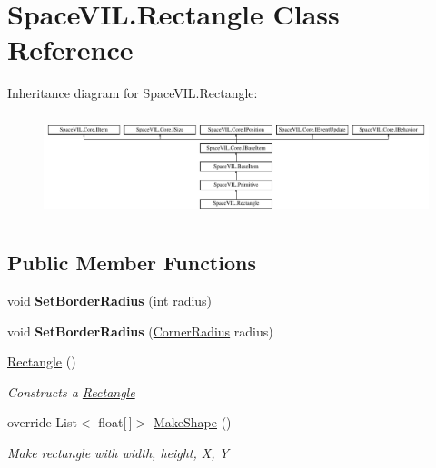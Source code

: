 \hypertarget{class_space_v_i_l_1_1_rectangle}{}\section{Space\+V\+I\+L.\+Rectangle Class Reference}
\label{class_space_v_i_l_1_1_rectangle}
Inheritance diagram for Space\+V\+I\+L.\+Rectangle\+:\begin{figure}[H]
\begin{center}
\leavevmode
\includegraphics[height=3.027027cm]{class_space_v_i_l_1_1_rectangle}
\end{center}
\end{figure}
\subsection*{Public Member Functions}
\begin{DoxyCompactItemize}
\item 
\mbox{\label{class_space_v_i_l_1_1_rectangle_ad07338f6cc154dfecd52971c44fcba17}} 
void {\bfseries Set\+Border\+Radius} (int radius)
\item 
\mbox{\label{class_space_v_i_l_1_1_rectangle_a99f6f1b16cc35215ae5edc166e256cde}} 
void {\bfseries Set\+Border\+Radius} (\mbox{\hyperlink{class_space_v_i_l_1_1_decorations_1_1_corner_radius}{Corner\+Radius}} radius)
\item 
\mbox{\hyperlink{class_space_v_i_l_1_1_rectangle_af59c31fe554514fabe70d2f1e97cf9d4}{Rectangle}} ()
\begin{DoxyCompactList}\small\item\em Constructs a \mbox{\hyperlink{class_space_v_i_l_1_1_rectangle}{Rectangle}} \end{DoxyCompactList}\item 
override List$<$ float\mbox{[}$\,$\mbox{]}$>$ \mbox{\hyperlink{class_space_v_i_l_1_1_rectangle_acc0a5018e266efaa750459bb875eb805}{Make\+Shape}} ()
\begin{DoxyCompactList}\small\item\em Make rectangle with width, height, X, Y \end{DoxyCompactList}\end{DoxyCompactItemize}
